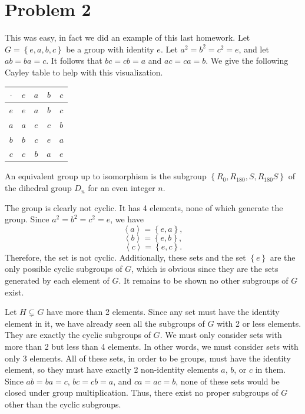 \documentclass[11pt, letterpaper]{report}
\renewenvironment{solution}[1][]{\begin{setsolution}}{\end{setsolution}}
\begin{document}
\section*{Problem 2}
\begin{solution}
	This was easy, in fact we did an example of this last homework. Let $G=\left\{ e,a,b,c \right\} $ be a group with identity $e$. Let $a^2=b^2=c^2=e$, and let $ab=ba=c$. It follows that $bc=cb=a$ and $ac=ca=b$. We give the following Cayley table to help with this visualization.
	\begin{center}
	\begin{tabular}{c|cccc}
		$\cdot $ &$e$ &$a$ &$b$ &$c$ \\
		\hline
		$e$ &$e$&$a$&$b$&$c$\\
		$a$ &$a$&$e$&$c$&$b$\\
		$b$ &$b$&$c$&$e$&$a$\\
		$c$ &$c$&$b$&$a$&$e$
	\end{tabular}
	\end{center}
	An equivalent group up to isomorphism is the subgroup $\left\{ R_0,R_{180},S,R_{180}S \right\} $ of the dihedral group $D_n$ for an even integer $n$.

	The group is clearly not cyclic. It has 4 elements, none of which generate the group. Since $a^2=b^2=c^2=e$, we have
	\[
		\left<a \right> = \left\{ e,a \right\} 
	,\]
	\[
		\left<b \right> =\left\{ e,b \right\} 
	,\]
	\[
		\left<c \right> =\left\{ e,c \right\} 
	.\]
	Therefore, the set is not cyclic. Additionally, these sets and the set $\left\{ e \right\} $ are the only possible cyclic subgroups of $G$, which is obvious since they are the sets generated by each element of $G$. It remains to be shown no other subgroups of $G$ exist.

	Let $H\subsetneq G$ have more than 2 elements. Since any set must have the identity element in it, we have already seen all the subgroups of $G$ with 2 or less elements. They are exactly the cyclic subgroups of $G$. We must only consider sets with more than 2 but less than 4 elements. In other words, we must consider sets with only 3 elements. All of these sets, in order to be groups, must have the identity element, so they must have exactly 2 non-identity elements $a $, $b$, or $c$ in them. Since $ab=ba=c$, $bc=cb=a$, and $ca=ac=b$, none of these sets would be closed under group multiplication. Thus, there exist no proper subgroups of $G$ other than the cyclic subgroups.
\end{solution}
\end{document}
